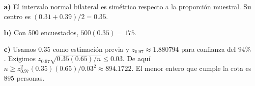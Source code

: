 \textbf{a)} El intervalo normal bilateral es simétrico
respecto a la proporción muestral. Su centro es
$(0.31+0.39)/2=\boxed{0.35}$.

\textbf{b)} Con 500 encuestados, $500(0.35)=\boxed{175}$.

\textbf{c)} Usamos $0.35$ como estimación previa y
$z_{0.97}\approx1.880794$ para confianza del $94\%$.
Exigimos $z_{0.97}\sqrt{0.35(0.65)/n}\le0.03$.
De aquí $n\ge z_{0.97}^2(0.35)(0.65)/0.03^2\approx 894.1722$.
El menor entero que cumple la cota es $\boxed{895}$ personas.
